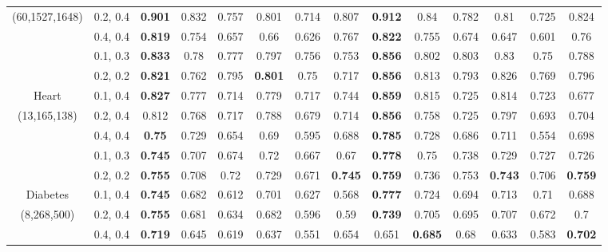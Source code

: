\begin{table}[ht]
\begin{tabular}{|c|c|c|c|c|c|c|c|c|c|c|c|c|c|}
(60,1527,1648) & 0.2, 0.4   & \textbf{0.901} & 0.832     & 0.757     & 0.801 & 0.714 & 0.807 
               & \textbf{0.912} & 0.84      & 0.782     & 0.81  & 0.725 & 0.824 \\
               & 0.4, 0.4   & \textbf{0.819} & 0.754     & 0.657     & 0.66  & 0.626 & 0.767 
               & \textbf{0.822} & 0.755     & 0.674     & 0.647 & 0.601 & 0.76  \\ \hline
               & 0.1, 0.3   & \textbf{0.833} & 0.78      & 0.777     & 0.797 & 0.756 & 0.753 
               & \textbf{0.856} & 0.802     & 0.803     & 0.83  & 0.75  & 0.788 \\ 
               & 0.2, 0.2   & \textbf{0.821} & 0.762     & 0.795     & \textbf{0.801} & 0.75  & 0.717 
               & \textbf{0.856} & 0.813     & 0.793     & 0.826 & 0.769 & 0.796 \\
Heart          & 0.1, 0.4   & \textbf{0.827} & 0.777     & 0.714     & 0.779 & 0.717 & 0.744 
               & \textbf{0.859} & 0.815     & 0.725     & 0.814 & 0.723 & 0.677 \\
(13,165,138)   & 0.2, 0.4   & 0.812 & 0.768     & 0.717     & 0.788 & 0.679 & 0.714 
               & \textbf{0.856} & 0.758     & 0.725     & 0.797 & 0.693 & 0.704 \\
               & 0.4, 0.4   & \textbf{0.75}  & 0.729     & 0.654     & 0.69  & 0.595 & 0.688 
               & \textbf{0.785} & 0.728     & 0.686     & 0.711 & 0.554 & 0.698 \\ \hline
               & 0.1, 0.3   & \textbf{0.745} & 0.707     & 0.674     & 0.72  & 0.667 & 0.67  
               & \textbf{0.778} & 0.75      & 0.738     & 0.729 & 0.727 & 0.726 \\ 
               & 0.2, 0.2   & \textbf{0.755} & 0.708     & 0.72      & 0.729 & 0.671 & \textbf{0.745}
               & \textbf{0.759} & 0.736     & 0.753     & \textbf{0.743} & 0.706 & \textbf{0.759} \\
Diabetes       & 0.1, 0.4   & \textbf{0.745} & 0.682     & 0.612     & 0.701 & 0.627 & 0.568 
               & \textbf{0.777} & 0.724     & 0.694     & 0.713 & 0.71  & 0.688 \\
(8,268,500)    & 0.2, 0.4   & \textbf{0.755} & 0.681     & 0.634     & 0.682 & 0.596 & 0.59  
               & \textbf{0.739} & 0.705     & 0.695     & 0.707 & 0.672 & 0.7   \\
               & 0.4, 0.4   & \textbf{0.719} & 0.645     & 0.619     & 0.637 & 0.551 & 0.654 
               & 0.651 & \textbf{0.685}     & 0.68      & 0.633 & 0.583 & \textbf{0.702} \\ \hline

\end{tabular}
\end{table}

